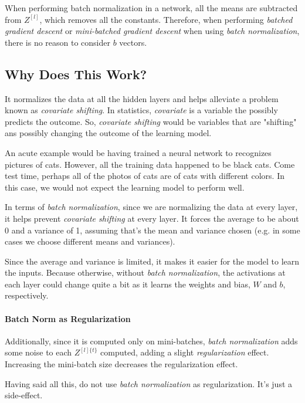 \documentclass{article}
\begin{document}
When performing batch normalization in a network, all the means are subtracted from $Z^{[l]}$, which removes all the constants.  Therefore, when performing \textit{batched gradient descent} or \textit{mini-batched gradient descent} when using \textit{batch normalization}, there is no reason to consider $b$ vectors.

\subsection{Why Does This Work?}

It normalizes the data at all the hidden layers and helps alleviate a problem known as \textit{covariate shifting}.  In statistics, \textit{covariate} is a variable the possibly predicts the outcome.  So, \textit{covariate shifting} would be variables that are "shifting" ans possibly changing the outcome of the learning model.

An acute example would be having trained a neural network to recognizes pictures of cats.  However, all the training data happened to be black cats.  Come test time, perhaps all of the photos of cats are of cats with different colors.  In this case, we would not expect the learning model to perform well.

In terms of \textit{batch normalization}, since we are normalizing the data at every layer, it helps prevent \textit{covariate shifting} at every layer.  It forces the average to be about 0 and a variance of 1, assuming that's the mean and variance chosen (e.g. in some cases we choose different means and variances).

Since the average and variance is limited, it makes it easier for the model to learn the inputs.  Because otherwise, without \textit{batch normalization}, the activations at each layer could change quite a bit as it learns the weights and bias, $W$ and $b$, respectively.

\paragraph{Batch Norm as Regularization}

Additionally, since it is computed only on mini-batches, \textit{batch normalization} adds some noise to each $Z^{[l]\{t\}}$ computed, adding a slight \textit{regularization} effect.  Increasing the mini-batch size decreases the regularization effect.

Having said all this, do not use \textit{batch normalization} as regularization.  It's just a side-effect.
\end{document}
